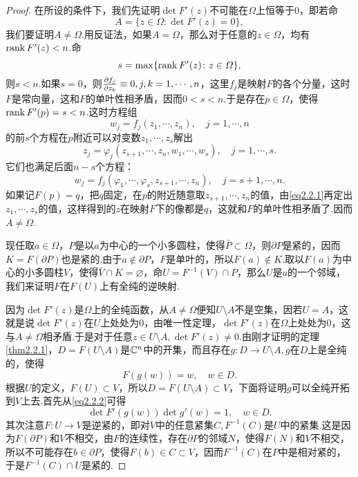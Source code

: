 \begin{proof}
	在所设的条件下，我们先证明$\det F'(z)$不可能在$\Omega$上恒等于$0$，即若命
	\[A=\{z\in\Omega\colon \det F'(z)=0\},\]
	我们要证明$A\neq\Omega$.用反证法，如果$A=\Omega$，那么对于任意的$z\in\Omega$，均有 $\operatorname{rank} F'(z)<n$.命
	\[s=\max\{\operatorname{rank} F'(z)\colon z\in\varOmega\},\]
	则$s<n$.如果$s=0$，则$\frac{\partial f_j}{\partial z_k}\equiv0,j,k=1,\cdots,n$，这里$f_j$是映射$F$的各个分量，这时$F$是常向量，这和$F$的单叶性相矛盾，因而$0<s<n$.于是存在$p\in\Omega$，使得 $\operatorname{rank} F'(p)=s<n$.这时方程组
	\[w_j=f_j(z_1,\cdots,z_n),\quad j=1,\cdots,n\]
	的前$s$个方程在$p$附近可以对变数$z_1,\cdots,z_s$解出
	\begin{equation}\label{eq2.2.1}
		z_j=\varphi_j(z_{s+1},\cdots,z_n,w_1,\cdots,w_s),\quad j=1,\cdots,s.
	\end{equation}
它们也满足后面$n-s$个方程：
\[w_j=f_j(\varphi_1,\cdots,\varphi_s,z_{s+1},\cdots,z_n),\quad j=s+1,\cdots,n.\]
如果记$F(p)=q$，把$q$固定，在$p$的附近随意取$z_{s+1},\cdots,z_n$的值，由\eqref{eq2.2.1}再定出$z_1,\cdots,z_s$的值，这样得到的$z$在映射$F$下的像都是$q$，这就和$F$的单叶性相矛盾了.因而$A\neq\Omega$.

现任取$a\in\Omega$，$P$是以$a$为中心的一个小多圆柱，使得$\bar{P}\subset\Omega$，则$\partial P$是紧的，因而$K=F(\partial P)$也是紧的.由于$a\notin\partial P$，$F$是单叶的，所以$F(a)\notin K$.取以$F(a)$为中心的小多圆柱$V$，使得$\bar{V}\cap K=\varnothing$，命$U=F^{-1}(V)\cap P$，那么$U$是$a$的一个邻域，我们来证明$F$在$F(U)$上有全纯的逆映射.

因为$\det F'(z)$是$\Omega$上的全纯函数，从$A\neq\Omega$便知$U\setminus A$不是空集，因若$U=A$，这就是说$\det F'(z)$在$U$上处处为$0$，由唯一性定理，$\det F'(z)$在$\Omega$上处处为$0$，这与$A\neq\Omega$相矛盾.于是对于任意$z\in U\setminus A,\det F'(z)\neq0$.由刚才证明的定理\ref{thm2.2.1}，$D=F(U\setminus A)$是$\mathbb C^n$中的开集，而且存在$g\colon D\to U\setminus A,g$在$D$上是全纯的，使得
\begin{equation}\label{eq2.2.2}
	F(g(w))=w,\quad w\in D.
\end{equation}
根据$U$的定义，$F(U)\subset V$，所以$D=F(U\setminus A)\subset V$，下面将证明$g$可以全纯开拓到$V$上去.首先从\eqref{eq2.2.2}可得
\begin{equation}\label{eq2.2.3}
	\det F'(g(w))\det g'(w)=1,\quad w\in D.
\end{equation}
其次注意$F\colon U\to V$是逆紧的，即对$V$中的任意紧集$C,F^{-1}(C)$是$U$中的紧集.这是因为$F(\partial P)$和$V$不相交，由$F$的连续性，存在$\partial P$的邻域$N$，使得$F(N)$和$V$不相交，所以不可能存在$b\in\partial P$，使得$F(b)\in C\subset V$，因而$F^{-1}(C)$在$P$中是相对紧的，于是$F^{-1}(C)\cap U$是紧的.


\end{proof}
